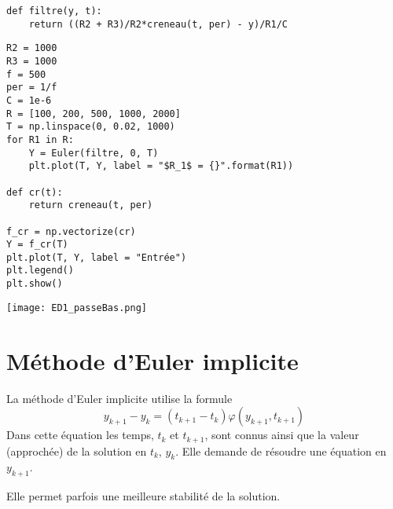 \begin{Answer}
\begin{lstlisting}
def filtre(y, t):
    return ((R2 + R3)/R2*creneau(t, per) - y)/R1/C
\end{lstlisting}

\begin{lstlisting}
R2 = 1000
R3 = 1000
f = 500
per = 1/f
C = 1e-6
R = [100, 200, 500, 1000, 2000]
T = np.linspace(0, 0.02, 1000)
for R1 in R:
    Y = Euler(filtre, 0, T)
    plt.plot(T, Y, label = "$R_1$ = {}".format(R1))
    
def cr(t):
    return creneau(t, per)
    
f_cr = np.vectorize(cr)
Y = f_cr(T)
plt.plot(T, Y, label = "Entrée")
plt.legend()
plt.show()
\end{lstlisting}
\begin{center}
	\texttt{[image: ED1\_passeBas.png]}
\end{center}
\newpage
\end{Answer}
\section{Méthode d'Euler implicite}
La méthode d'Euler implicite utilise la formule 
\[y_{k+1} - y_k = (t_{k+1} - t_k)\varphi(y_{k+1}, t_{k+1})\]
Dans cette équation les temps, $t_k$ et $t_{k+1}$, sont connus ainsi que la valeur (approchée) de la solution en $t_k$, $y_k$. Elle demande de résoudre une équation en $y_{k+1}$. 

Elle permet parfois une meilleure stabilité de la solution.
